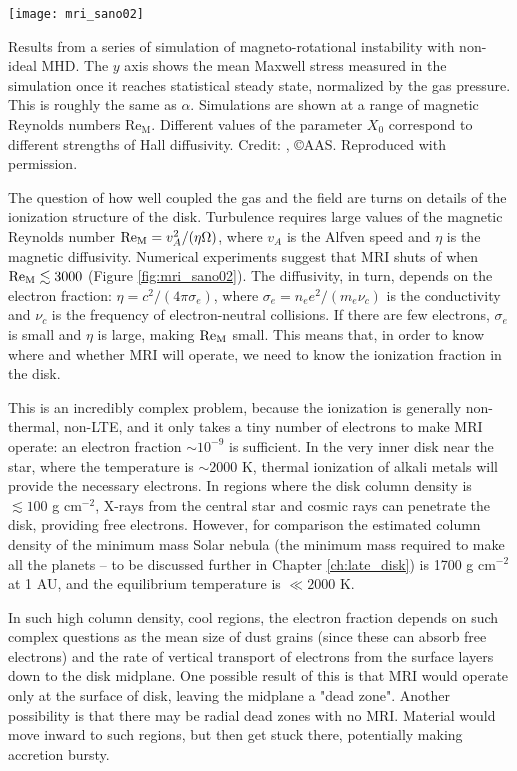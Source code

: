 \begin{marginfigure}
\texttt{[image: mri\_sano02]}
\caption[Maxwell stress in non-ideal MHD simulations of the MRI]{
\label{fig:mri_sano02}
Results from a series of simulation of magneto-rotational instability with non-ideal MHD. The $y$ axis shows the mean Maxwell stress measured in the simulation once it reaches statistical steady state, normalized by the gas pressure. This is roughly the same as $\alpha$. Simulations are shown at a range of magnetic Reynolds numbers $\mbox{Re}_{\mathrm{M}}$. Different values of the parameter $X_0$ correspond to different strengths of Hall diffusivity. Credit: \citet{sano02a}, \copyright AAS. Reproduced with permission.
}
\end{marginfigure}

The question of how well coupled the gas and the field are turns on details of the ionization structure of the disk. Turbulence requires large values of the magnetic Reynolds number $\mbox{Re}_{\rm M} = v_A^2 /(\eta\Omega)$, where $v_A$ is the Alfven speed and $\eta$ is the magnetic diffusivity. Numerical experiments suggest that MRI shuts of when $\mbox{Re}_{\rm M} \lesssim 3000$ (Figure \ref{fig:mri_sano02}). The diffusivity, in turn, depends on the electron fraction: $\eta = c^2/(4\pi \sigma_e)$, where $\sigma_e = n_e e^2/(m_e \nu_c)$ is the conductivity and $\nu_c$ is the frequency of electron-neutral collisions. If there are few electrons, $\sigma_e$ is small and $\eta$ is large, making $\mbox{Re}_{\rm M}$ small. This means that, in order to know where and whether MRI will operate, we need to know the ionization fraction in the disk.

This is an incredibly complex problem, because the ionization is generally non-thermal, non-LTE, and it only takes a tiny number of electrons to make MRI operate: an electron fraction $\sim 10^{-9}$ is sufficient. In the very inner disk near the star, where the temperature is $\sim 2000$ K, thermal ionization of alkali metals will provide the necessary electrons. In regions where the disk column density is $\lesssim 100$ g cm$^{-2}$, X-rays from the central star and cosmic rays can penetrate the disk, providing free electrons. However, for comparison the estimated column density of the minimum mass Solar nebula (the minimum mass required to make all the planets -- to be discussed further in Chapter \ref{ch:late_disk}) is 1700 g cm$^{-2}$ at 1 AU, and the equilibrium temperature is $\ll 2000$ K.

In such high column density, cool regions, the electron fraction depends on such complex questions as the mean size of dust grains (since these can absorb free electrons) and the rate of vertical transport of electrons from the surface layers down to the disk midplane. One possible result of this is that MRI would operate only at the surface of disk, leaving the midplane a "dead zone". Another possibility is that there may be radial dead zones with no MRI. Material would move inward to such regions, but then get stuck there, potentially making accretion bursty.

